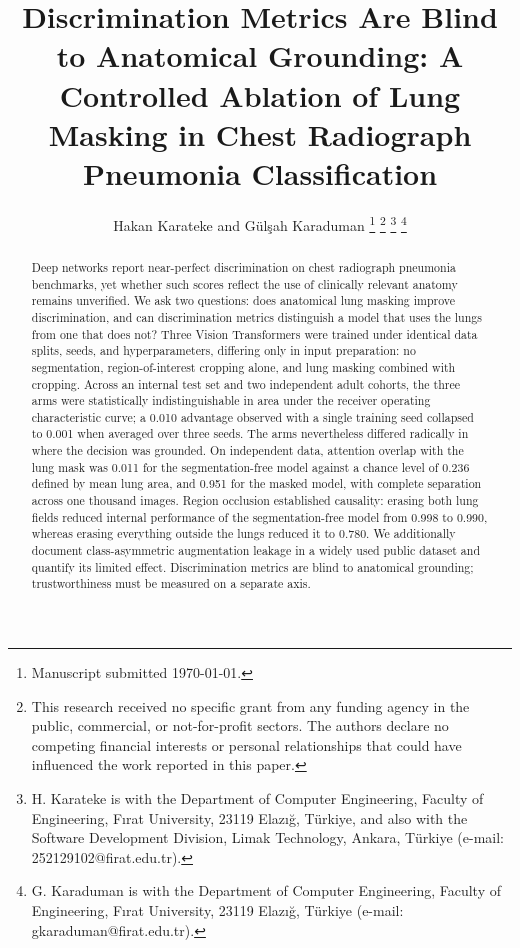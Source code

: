 \documentclass[journal,twoside,web]{ieeecolor}
\begin{document}
\title{Discrimination Metrics Are Blind to Anatomical Grounding: A Controlled Ablation of Lung Masking in Chest Radiograph Pneumonia Classification}

\author{Hakan Karateke and G\"{u}l\c{s}ah Karaduman
\thanks{Manuscript submitted \today.}
\thanks{This research received no specific grant from any funding agency in the public, commercial, or not-for-profit sectors. The authors declare no competing financial interests or personal relationships that could have influenced the work reported in this paper.}
\thanks{H. Karateke is with the Department of Computer Engineering, Faculty of Engineering, F\i rat University, 23119 Elaz\i \u{g}, T\"{u}rkiye, and also with the Software Development Division, Limak Technology, Ankara, T\"{u}rkiye (e-mail: 252129102@firat.edu.tr).}
\thanks{G. Karaduman is with the Department of Computer Engineering, Faculty of Engineering, F\i rat University, 23119 Elaz\i \u{g}, T\"{u}rkiye (e-mail: gkaraduman@firat.edu.tr).}}

\maketitle

\begin{abstract}
Deep networks report near-perfect discrimination on chest radiograph pneumonia benchmarks, yet whether such scores reflect the use of clinically relevant anatomy remains unverified. We ask two questions: does anatomical lung masking improve discrimination, and can discrimination metrics distinguish a model that uses the lungs from one that does not? Three Vision Transformers were trained under identical data splits, seeds, and hyperparameters, differing only in input preparation: no segmentation, region-of-interest cropping alone, and lung masking combined with cropping. Across an internal test set and two independent adult cohorts, the three arms were statistically indistinguishable in area under the receiver operating characteristic curve; a 0.010 advantage observed with a single training seed collapsed to 0.001 when averaged over three seeds. The arms nevertheless differed radically in where the decision was grounded. On independent data, attention overlap with the lung mask was 0.011 for the segmentation-free model against a chance level of 0.236 defined by mean lung area, and 0.951 for the masked model, with complete separation across one thousand images. Region occlusion established causality: erasing both lung fields reduced internal performance of the segmentation-free model from 0.998 to 0.990, whereas erasing everything outside the lungs reduced it to 0.780. We additionally document class-asymmetric augmentation leakage in a widely used public dataset and quantify its limited effect. Discrimination metrics are blind to anatomical grounding; trustworthiness must be measured on a separate axis.
\end{abstract}
\end{document}
